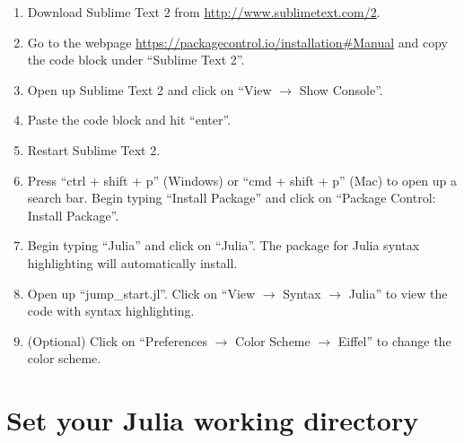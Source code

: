 \documentclass[12pt]{article}
\begin{document}
\begin{enumerate}

\item Download Sublime Text 2 from \url{http://www.sublimetext.com/2}.  

\item Go to the webpage \url{https://packagecontrol.io/installation\#Manual} and copy the code block under ``Sublime Text 2''.

\item Open up Sublime Text 2 and click on ``View $\rightarrow$ Show Console''.

\item Paste the code block and hit ``enter''.

\item Restart Sublime Text 2.  

\item Press ``ctrl + shift + p'' (Windows) or ``cmd + shift + p'' (Mac) to open up a search bar.  Begin typing ``Install Package'' and click on ``Package Control: Install Package''.  

\item Begin typing ``Julia'' and click on ``Julia''.  The package for Julia syntax highlighting will automatically install.  

\item Open up ``jump\_start.jl''.  Click on ``View $\rightarrow$ Syntax $\rightarrow$ Julia'' to view the code with syntax highlighting.  

\item (Optional) Click on ``Preferences $\rightarrow$ Color Scheme $\rightarrow$ Eiffel'' to change the color scheme.  

\end{enumerate}

\section{Set your Julia working directory}
\end{document}
